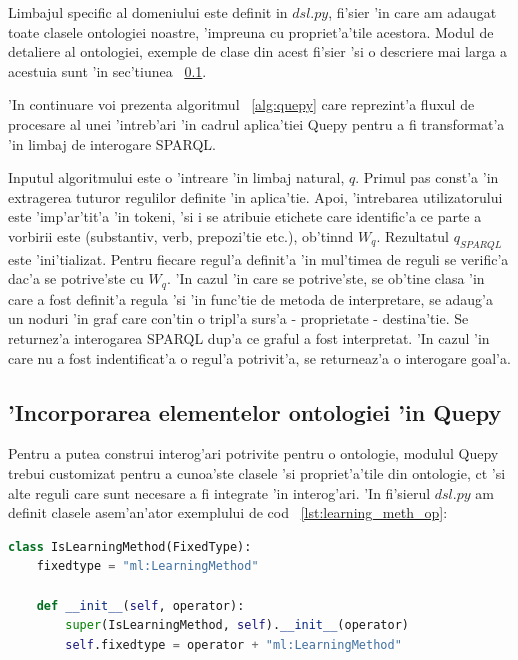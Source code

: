 \documentclass[12pt,a4paper,twoside]{report}
\begin{document}
Limbajul specific al domeniului este definit in $dsl.py$, fi'sier 'in care am adaugat toate clasele ontologiei noastre, 'impreuna cu propriet'a'tile acestora. Modul de detaliere al ontologiei, exemple de clase din acest fi'sier 'si o descriere mai larga a acestuia sunt 'in sec'tiunea ~\ref{sec:dsl}.

'In continuare voi prezenta algoritmul ~\ref{alg:quepy} care reprezint'a fluxul de procesare al unei 'intreb'ari 'in cadrul aplica'tiei Quepy pentru a fi transformat'a 'in limbaj de interogare SPARQL.

  

Inputul algoritmului este o 'intreare 'in limbaj natural, $q$. Primul pas const'a 'in extragerea tuturor regulilor definite 'in aplica'tie. Apoi, 'intrebarea utilizatorului este 'imp'ar'tit'a 'in tokeni, 'si i se atribuie etichete care identific'a ce parte a vorbirii este (substantiv, verb, prepozi'tie etc.), ob'tin\ia nd $W_q$. Rezultatul $q_{SPARQL}$ este 'ini'tializat. Pentru fiecare regul'a definit'a 'in mul'timea de reguli se verific'a dac'a se potrive'ste cu $W_q$. 'In cazul 'in care se potrive'ste, se ob'tine clasa 'in care a fost definit'a regula 'si 'in func'tie de metoda de interpretare, se adaug'a un noduri 'in graf care con'tin o tripl'a surs'a - proprietate - destina'tie. Se returnez'a interogarea SPARQL dup'a ce graful a fost interpretat. 'In cazul 'in care nu a fost indentificat'a o regul'a potrivit'a, se returneaz'a o interogare goal'a.

\subsection{'Incorporarea elementelor ontologiei 'in Quepy}
\label{sec:dsl}

Pentru a putea construi interog'ari potrivite pentru o ontologie, modulul Quepy trebui customizat pentru a cunoa'ste clasele 'si propriet'a'tile din ontologie, c\ia t 'si alte reguli care sunt necesare a fi integrate 'in interog'ari. 'In fi'sierul $dsl.py$ am definit clasele asem'an'ator exemplului de cod ~\ref{lst:learning_meth_op}: 
\begin{lstlisting}[basicstyle=\footnotesize, language = Python, label = lst:learning_meth_op, caption = Clasa LearningMethod]
   class IsLearningMethod(FixedType):
    fixedtype = "ml:LearningMethod"

    def __init__(self, operator):
        super(IsLearningMethod, self).__init__(operator)
        self.fixedtype = operator + "ml:LearningMethod"

\end{lstlisting}
\end{document}
